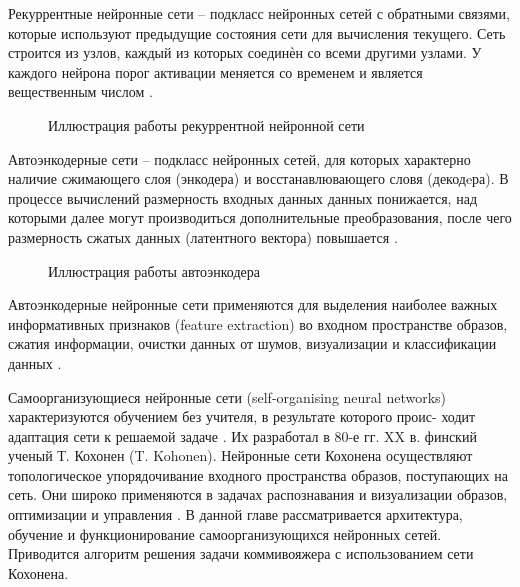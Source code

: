 Рекуррентные нейронные сети -- подкласс нейронных сетей с обратными связями, которые
используют предыдущие состояния сети для вычисления текущего. Сеть строится из узлов, каждый
из которых соединѐн со всеми другими узлами. У каждого нейрона порог активации меняется со
временем и является вещественным числом \cite{bguir_rnn}. 
\begin{figure}[H]
	\caption{Иллюстрация работы рекуррентной нейронной сети}
\end{figure}

Автоэнкодерные сети -- подкласс нейронных сетей, для которых характерно наличие сжимающего слоя (энкодера) и восстанавлювающего словя (декодeра).
В процессе вычислений размерность входных данных данных понижается, над которыми далее могут производиться дополнительные преобразования, 
после чего размерность сжатых данных (латентного вектора) повышается \cite{vae}.
\begin{figure}[H]
	\caption{Иллюстрация работы автоэнкодера}
\end{figure}

Автоэнкодерные нейронные сети применяются для выделения наиболее важных информативных признаков 
(feature extraction) во входном пространстве образов, сжатия информации, очистки
данных от шумов, визуализации и классификации данных \cite{bgu_krasn}.

Самоорганизующиеся нейронные сети (self-organising neural networks)
характеризуются обучением без учителя, в результате которого проис-
ходит адаптация сети к решаемой задаче . Их разработал в 80-е гг. XX в.
финский ученый Т. Кохонен (T. Kohonen). Нейронные сети
Кохонена осуществляют топологическое упорядочивание входного
пространства образов, поступающих на сеть. Они широко применяются
в задачах распознавания и визуализации образов, оптимизации и
управления . В данной главе рассматривается архитектура, обучение и
функционирование самоорганизующихся нейронных сетей. Приводится алгоритм решения задачи коммивояжера с использованием сети Кохонена.

